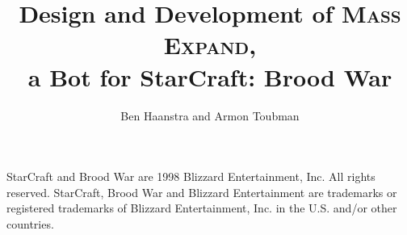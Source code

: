 \documentclass[11pt,a4paper,oneside]{book} %
\title{\huge Design and Development of \textsc{Mass Expand},\\ a Bot for StarCraft\textsuperscript{\small \textregistered}: Brood War\textsuperscript{\small \textregistered}}
\author{Ben Haanstra and Armon Toubman}
\begin{document}
\maketitle

\noindent{}StarCraft and Brood War are \textcopyright{}1998 Blizzard Entertainment, Inc. All rights reserved. StarCraft, Brood War and Blizzard Entertainment are trademarks or registered trademarks of Blizzard Entertainment, Inc. in the U.S. and/or other countries.
\pagestyle{empty}
\clearpage

\frontmatter

\tableofcontents

\listoffigures


\mainmatter












\backmatter




\end{document}
